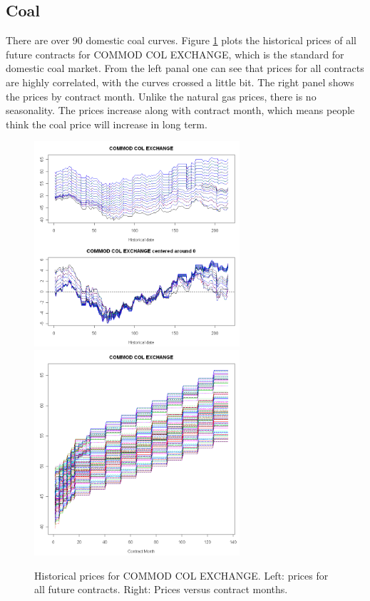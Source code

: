 \subsection{Coal}
There are over 90 domestic coal curves. 
Figure \ref{col-hist} plots the historical prices of all
future contracts for COMMOD COL EXCHANGE, which is the standard
for domestic coal market. From the left panal
one can see that prices for all contracts 
are highly correlated, with the curves crossed a little bit. 
The right panel shows the prices by contract month.
Unlike the natural gas prices, there is no seasonality. 
The prices increase along with contract month, 
which means people think the coal price will increase 
in long term. 
\begin{figure}[htbp]
\centering
\includegraphics[width=3in, height=3in]{figures/col01.png}
\includegraphics[width=3in, height=3in]{figures/col02.png}
\caption{Historical prices for COMMOD COL EXCHANGE. 
Left: prices for all future contracts. 
Right: Prices versus contract months.}
\label{col-hist}
\end{figure}


